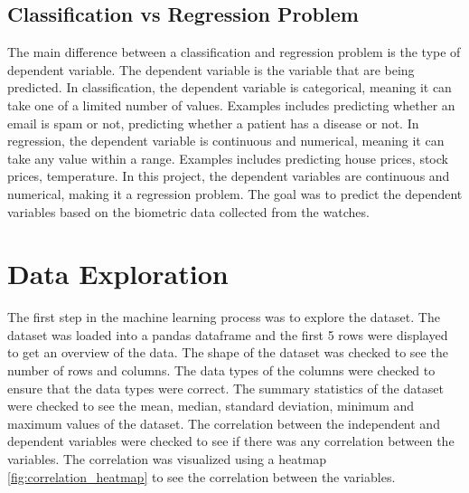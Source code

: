 \subsection*{Classification vs Regression Problem}
The main difference between a classification and regression problem is the type of dependent variable. The dependent variable is the variable that are being predicted. In 
classification, the dependent variable is categorical, meaning it can take one of a limited number of values. Examples includes predicting whether an email is spam or not,
predicting whether a patient has a disease or not. In regression, the dependent variable is continuous and numerical, meaning it can take any value within a range. Examples 
includes predicting house prices, stock prices, temperature. In this project, the dependent variables are continuous and numerical, making it a regression problem. The goal 
was to predict the dependent variables based on the biometric data collected from the watches. 

\section{Data Exploration}
The first step in the machine learning process was to explore the dataset. The dataset was loaded into a pandas dataframe and the first 5 rows were displayed to get an overview of the
data. The shape of the dataset was checked to see the number of rows and columns. The data types of the columns were checked to ensure that the data types were correct. The summary
statistics of the dataset were checked to see the mean, median, standard deviation, minimum and maximum values of the dataset. The correlation between the independent and dependent
variables were checked to see if there was any correlation between the variables. The correlation was visualized using a heatmap \ref{fig:correlation_heatmap} to see the correlation 
between the variables.

